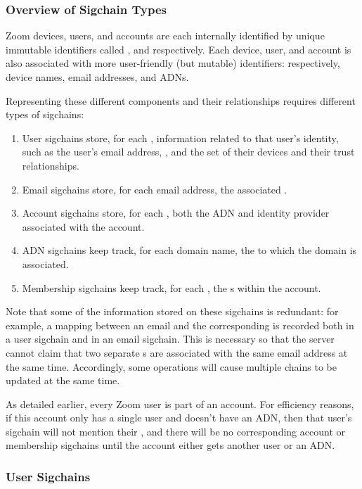\subsubsection{Overview of Sigchain Types}

Zoom devices, users, and accounts are each internally identified by unique immutable identifiers
called \deviceid, \userID and \accountID respectively. Each device, user, and account is also
associated with more user-friendly (but mutable) identifiers: respectively, device names, email
addresses, and ADNs.

Representing these different components and their relationships requires different types of
sigchains:

\begin{enumerate}
\item User sigchains store, for each \userID, information related to that user’s identity, such as
    the user’s email address, \accountID, and the set of their devices and their trust
    relationships.
\item Email sigchains store, for each email address, the associated \userID.
\item Account sigchains store, for each \accountID, both the ADN and identity provider associated with
    the account.
\item ADN sigchains keep track, for each domain name, the \accountID to which the domain is
    associated.
\item Membership sigchains keep track, for each \accountID, the {\userID}s within the account.
\end{enumerate}

Note that some of the information stored on these sigchains is redundant: for example, a mapping
between an email and the corresponding \userID is recorded both in a user sigchain and in an email
sigchain. This is necessary so that the server cannot claim that two separate {\userID}s are
associated with the same email address at the same time. Accordingly, some operations will cause
multiple chains to be updated at the same time.

As detailed earlier, every Zoom user is part of an account. For efficiency reasons, if this account
only has a single user and doesn't have an ADN, then that user's sigchain will not mention their
\accountID, and there will be no corresponding account or membership sigchains until the
account either gets another user or an ADN.

\subsubsection{User Sigchains}

